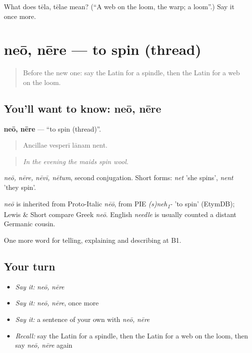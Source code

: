 \begin{tcolorbox}[breakable,colback=teal!4,colframe=teal!35!black,title={Before you move on}]
What does tēla, tēlae mean? (\textquotedblleft{}A web on the loom, the warp; a loom\textquotedblright{}.) Say it once more.
\end{tcolorbox}
\section[neō, nēre]{neō, nēre — to spin (thread)}

\label{lesson:LA-C472-neo}



\begin{quote}
Before the new one: say the Latin for a spindle, then the Latin for a web on the loom.
\end{quote}

\subsection*{You'll want to know: neō, nēre}
\textbf{neō, nēre} — \textquotedblleft{}to spin (thread)\textquotedblright{}.

\begin{quote}
Ancillae vesperī lānam nent.
\end{quote}

\begin{quote}
\emph{In the evening the maids spin wool.}
\end{quote}

\emph{neō, nēre, nēvī, nētum}, second conjugation. Short forms: \emph{net} 'she spins', \emph{nent} 'they spin'.

\begin{cousinweb}
\emph{neō} is inherited from Proto-Italic \emph{nēō}, from PIE \emph{(s)neh\textsubscript{1}-} 'to spin' (EtymDB); Lewis \& Short compare Greek \emph{neō}. English \emph{needle} is usually counted a distant Germanic cousin.
\end{cousinweb}

\begin{grammarlens}[title={What you've built}]
One more word for telling, explaining and describing at B1.
\end{grammarlens}

\subsection*{Your turn}
\begin{itemize}
\raggedright
  \item \emph{Say it:} \emph{neō, nēre}
  \item \emph{Say it:} \emph{neō, nēre}, once more
  \item \emph{Say it:} a sentence of your own with \emph{neō, nēre}
  \item \emph{Recall:} say the Latin for a spindle, then the Latin for a web on the loom, then say \emph{neō, nēre} again
\end{itemize}

